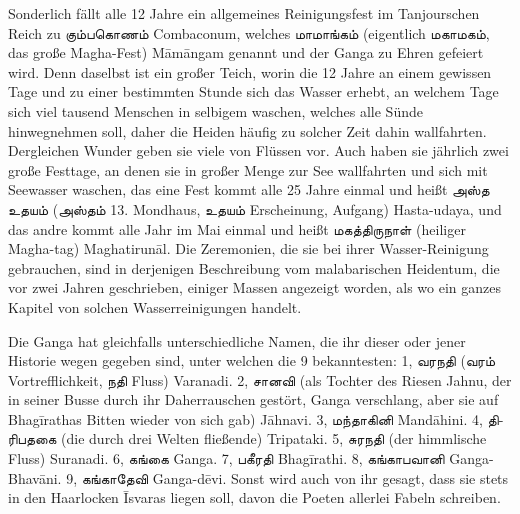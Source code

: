 \documentclass{article}
\newcommand{\TamilText}[1]{\texttamil{#1}}
\newcommand{\tam}[1]{\TamilText{#1}}
\begin{document}
Sonderlich fällt alle 12 Jahre ein allgemeines Reinigungsfest im Tanjourschen Reich zu \tam{கும்பகொணம்} Combaconum, welches \tam{மாமாங்கம்} (eigentlich \tam{மகாமகம்}, das große Magha-Fest) M\={a}m\={a}ngam genannt und der Ganga zu Ehren gefeiert wird. Denn daselbst ist ein großer Teich, worin die 12 Jahre an einem gewissen Tage und zu einer bestimmten Stunde sich das Wasser erhebt, an welchem Tage sich viel tausend Menschen in selbigem waschen, welches alle Sünde hinwegnehmen soll, daher die Heiden häufig zu solcher Zeit dahin wallfahrten. Dergleichen Wunder geben sie viele von Flüssen vor. Auch haben sie jährlich zwei große Festtage, an denen sie in großer Menge zur See wallfahrten und sich mit Seewasser waschen, das eine Fest kommt alle 25 Jahre einmal und heißt \tam{அஸ்த} \tam{உதயம்} (\tam{அஸ்தம்} 13. Mondhaus, \tam{உதயம்} Erscheinung, Aufgang) Hasta-udaya, und das andre kommt alle Jahr im Mai einmal und heißt \tam{மகத்திருநாள்} (heiliger Magha-tag) Maghatirun\={a}l. Die Zeremonien, die sie bei ihrer Wasser-Reinigung gebrauchen, sind in derjenigen Beschreibung vom malabarischen Heidentum, die vor zwei Jahren geschrieben, einiger Massen angezeigt worden, als wo ein ganzes Kapitel von solchen Wasserreinigungen handelt.

Die Ganga hat gleichfalls unterschiedliche Namen, die ihr dieser oder jener Historie wegen gegeben sind, unter welchen die 9 bekanntesten: 1, \tam{வரநதி} (\tam{வரம்} Vortrefflichkeit, \tam{நதி} Fluss) Varanadi. 2, \tam{சானவி} (als Tochter des Riesen Jahnu, der in seiner Busse durch ihr Daherrauschen gestört, Ganga verschlang, aber sie auf Bhag\={i}rathas Bitten wieder von sich gab) J\={a}hnavi. 3, \tam{மந்தாகினி} Mand\={a}hini. 4, \tam{திரிபதகை} (die durch drei Welten fließende) Tripataki. 5, \tam{சுரநதி} (der himmlische Fluss) Suranadi. 6, \tam{கங்கை} Ganga. 7, \tam{பகீரதி} Bhag\={i}rathi. 8, \tam{கங்காபவானி} Ganga-Bhav\={a}ni. 9, \tam{கங்காதேவி} Ganga-d\={e}vi. Sonst wird auch von ihr gesagt, dass sie stets in den Haarlocken \={I}svaras liegen soll, davon die Poeten allerlei Fabeln schreiben.
\end{document}
